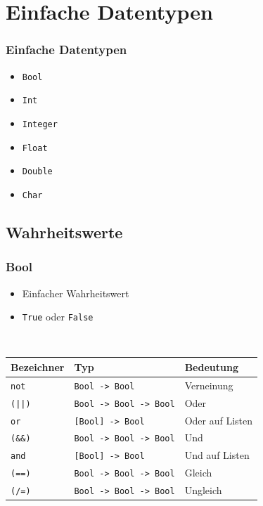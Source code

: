 \documentclass[fleqn,11pt,aspectratio=43]{beamer}
\begin{document}
\section{Einfache Datentypen~}
\begin{frame}
\frametitle{Einfache Datentypen}
\begin{block}{\vspace*{-2ex}}
\begin{itemize}
  \item \lstinline|Bool|
  \item \lstinline|Int|
  \item \lstinline|Integer|
  \item \lstinline|Float|
  \item \lstinline|Double|
  \item \lstinline|Char|
\end{itemize}
\end{block}
\end{frame}
\subsection{Wahrheitswerte}
\begin{frame}[fragile]
\frametitle{Bool}
\begin{block}{\vspace*{-2ex}}
\begin{itemize}
  \item Einfacher Wahrheitswert
  \item \lstinline|True| oder \lstinline|False|
\end{itemize}
 \begin{tabular}{lll} %
	Bezeichner 			& Typ 				 		& Bedeutung\\ \hline
	\lstinline|not| 	& \lstinline|Bool -> Bool| 		& Verneinung\\
	\lstinline!(||)!	& \lstinline|Bool -> Bool -> Bool| 	& Oder\\
	\lstinline|or| 		& \lstinline|[Bool] -> Bool| 		& Oder auf Listen\\
	\lstinline|(&&)| 	& \lstinline|Bool -> Bool -> Bool| 	& Und\\
	\lstinline|and| 	& \lstinline|[Bool] -> Bool| 		& Und auf Listen\\
	\lstinline|(==)| 	& \lstinline|Bool -> Bool -> Bool| 	& Gleich\\
	\lstinline|(/=)| 	& \lstinline|Bool -> Bool -> Bool| 	& Ungleich
\end{tabular}
\end{block}
\end{frame}
\end{document}
